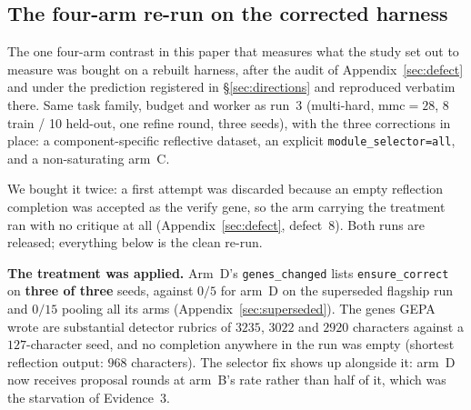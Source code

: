 \documentclass[11pt]{article}
\begin{document}
\subsection{The four-arm re-run on the corrected harness}
\label{sec:rerun}

The one four-arm contrast in this paper that measures what the study set out to measure was bought on a rebuilt harness, after the audit of Appendix~\ref{sec:defect} and under the prediction registered in \S\ref{sec:directions} and reproduced verbatim there. Same task family, budget and worker as run~3
(multi-hard, $\mathrm{mmc}=28$, 8 train / 10 held-out, one refine round, three seeds), with
the three corrections in place: a component-specific reflective dataset, an explicit
\texttt{module\_selector=all}, and a non-saturating arm~C.

We bought it twice: a first attempt was discarded because an empty reflection completion was
accepted as the verify gene, so the arm carrying the treatment ran with no critique at all
(Appendix~\ref{sec:defect}, defect~8). Both runs are released; everything below is the clean
re-run.

\textbf{The treatment was applied.} Arm~D's \texttt{genes\_changed} lists
\texttt{ensure\_correct} on \textbf{three of three} seeds, against $0/5$ for arm~D on the
superseded flagship run and $0/15$ pooling all its arms (Appendix~\ref{sec:superseded}). The genes GEPA wrote are substantial detector rubrics of $3235$,
$3022$ and $2920$ characters against a $127$-character seed, and no completion anywhere in
the run was empty (shortest reflection output: $968$ characters). The selector fix shows up
alongside it: arm~D now receives proposal rounds at arm~B's rate rather than half of it,
which was the starvation of Evidence~3.
\end{document}
